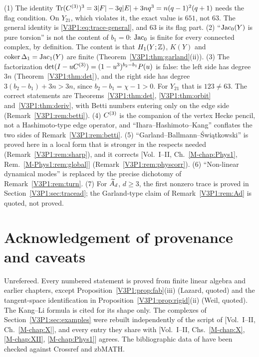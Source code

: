 \begin{remark}\label{V3P1:rem:corrections}
(1) The identity $\operatorname{Tr}(C^{(3)})^{3}=3|F|-3q|E|+3nq^{3}=n(q-1)^{2}(q+1)$ needs the flag
condition. On $Y_{21}$, which violates it, the exact value is $651$, not $63$. The general
identity is \eqref{V3P1:eq:trace-general}, and $63$ is its flag part. (2) ``$\operatorname{Jac}_0(Y)$ is pure
torsion'' is not the content of $b_1=0$: $\operatorname{Jac}_0$ is finite for every connected complex, by
definition. The content is that $H_1(Y;\mathbb{Z})$, $K(Y)$ and $\operatorname{coker}\Delta_1=\operatorname{Jac}_1(Y)$ are finite
(Theorem~\ref{V3P1:thm:garland}(ii)). (3) The factorization
$\det(I-uC^{(3)})=(1-u^{3})^{b_2-b_1}P(u)$ is false: the left side has degree $3n$
(Theorem~\ref{V3P1:thm:det}), and the right side has degree $3(b_2-b_1)+3n>3n$, since
$b_2-b_1=\chi-1>0$. For $Y_{21}$ that is $123\neq63$. The correct statements are
Theorems~\ref{V3P1:thm:det}, \ref{V3P1:thm:orbit} and~\ref{V3P1:thm:deriv}, with Betti numbers
entering only on the edge side (Remark~\ref{V3P1:rem:betti}). (4) $C^{(3)}$ is the companion of
the vertex Hecke pencil, not a Hashimoto-type edge operator, and ``Ihara--Hashimoto--Kang''
conflates the two sides of Remark~\ref{V3P1:rem:betti}. (5) ``Garland--Ballmann--\'Swi\k{a}tkowski''
is proved here in a local form that is stronger in the respects needed
(Remark~\ref{V3P1:rem:sharp}), and it corrects [Vol.~I--II, Ch.~\ref{M-chap:Phys1},
Rem.~\ref{M-Phys1:rem:global}] (Remark~\ref{V3P1:rem:physcorr}). (6) ``Non-linear dynamical modes''
is replaced by the precise dichotomy of Remark~\ref{V3P1:rem:turn}. (7) For $\widetilde A_{d}$, $d\ge3$,
the first nonzero trace is proved in Section~\ref{V3P1:sec:tracead}; the Garland-type claim of
Remark~\ref{V3P1:rem:Ad} is quoted, not proved.
\end{remark}

\section*{Acknowledgement of provenance and caveats}

Unrefereed. Every numbered statement is proved from finite linear algebra and earlier
chapters, except Proposition~\ref{V3P1:prop:fab}(iii) (Lazard, quoted) and the tangent-space
identification in Proposition~\ref{V3P1:prop:rigid}(ii) (Weil, quoted). The Kang--Li formula
is cited for its shape only. The complexes of Section~\ref{V3P1:sec:examples} were rebuilt
independently of the script of [Vol.~I--II, Ch.~\ref{M-chap:X}], and every entry they share with
[Vol.~I--II, Chs.~\ref{M-chap:X}, \ref{M-chap:XII}, \ref{M-chap:Phys1}] agrees. The bibliographic data of
\cite{Laz65,DDMS,Wei64,Zuk96} have been checked against Crossref and zbMATH.
